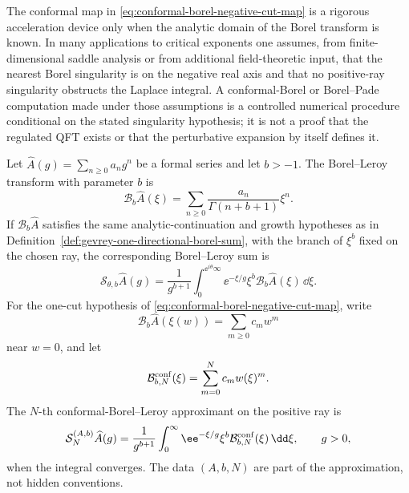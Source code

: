 \begin{remark}
\label{rem:conformal-borel-numerics-status}
The conformal map in
\eqref{eq:conformal-borel-negative-cut-map} is a rigorous
acceleration device only when the analytic domain of the Borel transform is
known.  In many applications to critical exponents one assumes, from
finite-dimensional saddle analysis or from additional field-theoretic input,
that the nearest Borel singularity is on the negative real axis and that no
positive-ray singularity obstructs the Laplace integral.  A conformal-Borel
or Borel--Pade computation made under those assumptions is a controlled
numerical procedure conditional on the stated singularity hypothesis; it is
not a proof that the regulated QFT exists or that the perturbative expansion
by itself defines it.
\end{remark}

\begin{definition}
\label{def:borel-leroy-conformal-approximants}
Let
\(\widehat A(g)=\sum_{n\ge0}a_n g^n\) be a formal series and let \(b>-1\).
The Borel--Leroy transform with parameter \(b\) is
\begin{equation}
  \mathcal B_b\widehat A(\xi)
  =
  \sum_{n\ge0}\frac{a_n}{\Gamma(n+b+1)}\xi^n .
  \label{eq:borel-leroy-transform}
\end{equation}
If \(\mathcal B_b\widehat A\) satisfies the same analytic-continuation and
growth hypotheses as in Definition~\ref{def:gevrey-one-directional-borel-sum},
with the branch of \(\xi^b\) fixed on the chosen ray, the corresponding
Borel--Leroy sum is
\begin{equation}
  \mathcal S_{\theta,b}\widehat A(g)
  =
  \frac1{g^{b+1}}
  \int_0^{\ee^{i\theta}\infty}
  \ee^{-\xi/g}\xi^b
  \mathcal B_b\widehat A(\xi)\,\dd\xi .
  \label{eq:borel-leroy-sum}
\end{equation}
For the one-cut hypothesis of
\eqref{eq:conformal-borel-negative-cut-map}, write
\[
  \mathcal B_b\widehat A(\xi(w))
  =
  \sum_{m\ge0}c_m w^m
\]
near \(w=0\), and let
\begin{equation}
  \mathcal B_{b,N}^{\rm conf}(\xi)
  =
  \sum_{m=0}^N c_m w(\xi)^m .
  \label{eq:truncated-conformal-borel-transform}
\end{equation}
The \(N\)-th conformal-Borel--Leroy approximant on the positive ray is
\begin{equation}
  \mathcal S_{N}^{(A,b)}\widehat A(g)
  =
  \frac1{g^{b+1}}
  \int_0^\infty
  \ee^{-\xi/g}\xi^b
  \mathcal B_{b,N}^{\rm conf}(\xi)\,\dd\xi ,
  \qquad g>0,
  \label{eq:conformal-borel-leroy-approximant}
\end{equation}
when the integral converges.  The data \((A,b,N)\) are part of the
approximation, not hidden conventions.
\end{definition}

